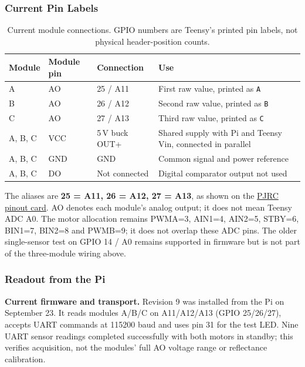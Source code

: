 \clearpage
\subsubsection{Current Pin Labels}
\begin{table}[H]
\centering\small
\caption{Current module connections. GPIO numbers are Teensy's printed pin labels, not physical header-position counts.}
\label{tab:tcrt5000-prototype-pins}
\begin{tabular}{@{}L{2.1cm}L{2.1cm}L{3.4cm}L{7.7cm}@{}}
\toprule
\textbf{Module} & \textbf{Module pin} & \textbf{Connection} & \textbf{Use} \\
\midrule
A & AO & 25 / A11 & First raw value, printed as \texttt{A} \\
B & AO & 26 / A12 & Second raw value, printed as \texttt{B} \\
C & AO & 27 / A13 & Third raw value, printed as \texttt{C} \\
A, B, C & VCC & 5\,V buck OUT+ & Shared supply with Pi and Teensy Vin, connected in parallel \\
A, B, C & GND & GND & Common signal and power reference \\
A, B, C & DO & Not connected & Digital comparator output not used \\
\bottomrule
\end{tabular}
\end{table}

The aliases are \textbf{25 = A11, 26 = A12, 27 = A13}, as shown on the \href{https://www.pjrc.com/teensy/card11a_rev4_web.pdf}{PJRC pinout card}. AO denotes each module's analog output; it does not mean Teensy ADC A0. The motor allocation remains PWMA=3, AIN1=4, AIN2=5, STBY=6, BIN1=7, BIN2=8 and PWMB=9; it does not overlap these ADC pins. The older single-sensor test on GPIO 14 / A0 remains supported in firmware but is not part of the three-module wiring above.

\subsubsection{Readout from the Pi}
\noindent\textbf{Current firmware and transport.} Revision 9 was installed from the Pi on September 23. It reads modules A/B/C on A11/A12/A13 (GPIO 25/26/27), accepts UART commands at 115200 baud and uses pin 31 for the test LED. Nine UART sensor readings completed successfully with both motors in standby; this verifies acquisition, not the modules' full AO voltage range or reflectance calibration.

